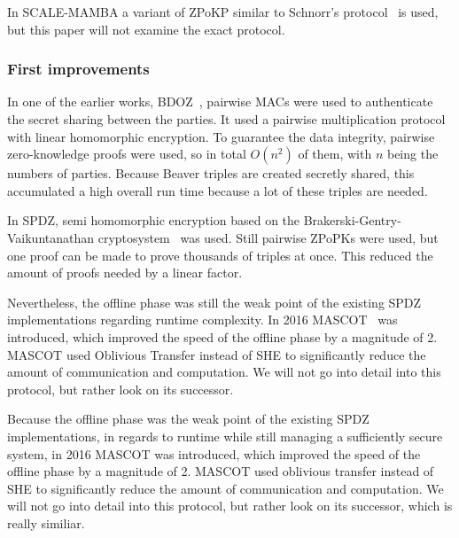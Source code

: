\documentclass[english,runningheads,a4paper]{llncs}[2018/03/10]
\begin{document}
In SCALE-MAMBA a variant of ZPoKP similar to Schnorr's protocol~\cite{Schnorr} is used, but this paper will not examine the exact protocol.

\subsubsection{First improvements}
In one of the earlier works, BDOZ~\cite{cryptoeprint:2010:514}, pairwise MACs were used to authenticate the secret sharing between the parties. It used a pairwise multiplication protocol with linear homomorphic encryption. To guarantee the data integrity, pairwise zero-knowledge proofs were used, so in total $O(n^2)$ of them, with $n$ being the numbers of parties. Because Beaver triples are created secretly shared, this accumulated a high overall run time because a lot of these triples are needed.

In SPDZ, semi homomorphic encryption based on the Brakerski-Gentry-Vaikuntanathan cryptosystem~\cite{cryptoeprint:2011:277} was used. Still pairwise ZPoPKs were used, but one proof can be made to prove thousands of triples at once. This reduced the amount of proofs needed by a linear factor.

Nevertheless, the offline phase was still the weak point of the existing SPDZ implementations regarding runtime complexity. In 2016 MASCOT~\cite{cryptoeprint:2016:505} was introduced, which improved the speed of the offline phase by a magnitude of 2. MASCOT used Oblivious Transfer instead of SHE to significantly reduce the amount of communication and computation. We will not go into detail into this protocol, but rather look on its successor.


Because the offline phase was the weak point of the existing SPDZ implementations, in regards to runtime while still managing a sufficiently secure system, in 2016 MASCOT \cite{cryptoeprint:2016:505} was introduced, which improved the speed of the offline phase by a magnitude of 2. MASCOT used oblivious transfer instead of SHE to significantly reduce the amount of communication and computation. We will not go into detail into this protocol, but rather look on its successor, which is really similiar.
\end{document}
